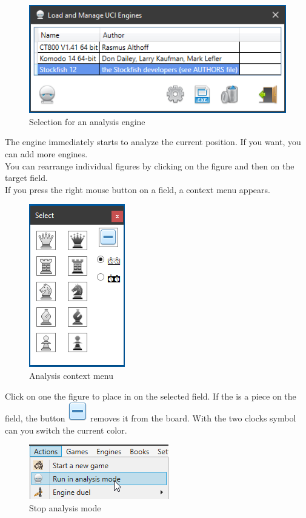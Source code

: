 \documentclass[11pt,a4paper]{article}
\begin{document}
\begin{figure}[H]
	\centering
	\includegraphics[scale=0.9]{AnalyzeMode2.png}
	\caption{Selection for an analysis engine}
	\label{fig:AnalyzeMode2_2}
\end{figure}

The engine immediately starts to analyze the current position. If you want, you can add more engines.\\
You can rearrange individual figures by clicking on the figure and then on the target field.\\
If you press the right mouse button on a field, a context menu appears.

\begin{figure}[H]
	\centering
	\includegraphics[scale=1.0]{AnalyzeMode4.png}
	\caption{Analysis context menu}
	\label{fig:AnalyzeMode4}
\end{figure}

Click on one the figure to place in on the selected field. If the is a piece on the field, the button \includegraphics[scale=0.3]{toggle.png} removes it from the board. With the two clocks symbol can you switch the current color.

\begin{figure}[H]
	\centering
	\includegraphics[scale=1.0]{AnalyzeMode3.png}
	\caption{Stop analysis mode}
	\label{fig:AnalyzeMode3_2}
\end{figure}
\end{document}

